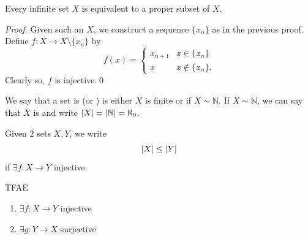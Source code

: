 \documentclass[notoc,notitlepage]{tufte-book}
\begin{document}
\begin{crly}\label{crly:infinite_sets_are_equivalent_to_its_proper_subsets}
  Every infinite set $X$ is equivalent to a proper subset of $X$.
\end{crly}

\begin{proof}
  Given such an $X$, we construct a sequence $\{ x_n \}$ as in the previous proof. Define $f : X \to X \setminus \{ x_n \}$ by
  \begin{equation*}
    f(x) = \begin{cases}
      x_{n + 1} & x \in \{x_n\} \\
      x         & x \notin \{ x_n \}.
    \end{cases}
  \end{equation*}
  Clearly so, $f$ is injective.\qed
\end{proof}

\begin{defn}[Countable]\label{defn:countable}
  We say that a set is  (or ) is either $X$ is finite or if $X \sim \mathbb{N}$. If $X \sim \mathbb{N}$, we can say that $X$ is  and write $\left|X\right| = \left|\mathbb{N}\right| = \aleph_0$.
\end{defn}

\begin{defn}\label{defn:smaller_cardinality}
  Given $2$ sets $X, Y$, we write
  \begin{equation*}
    \left|X\right| \leq \left|Y\right|
  \end{equation*}
  if $\exists f : X \to Y$ injective.
\end{defn}

\begin{propo}\label{propo:injectivity_is_surjectivity_reversed}
  TFAE
  \begin{enumerate}
    \item $\exists f : X \to Y$ injective
    \item $\exists g : Y \to X$ surjective
  \end{enumerate}
\end{propo}
\end{document}
